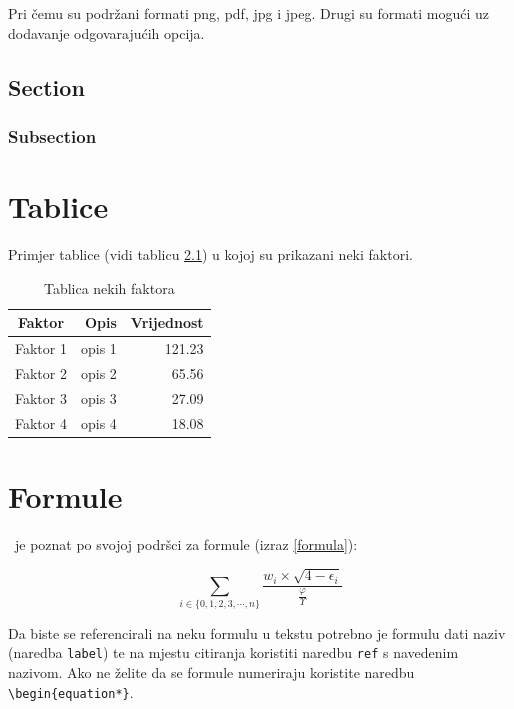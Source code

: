 \documentclass[a4paper,12pt]{foi}
\begin{document}
Pri \v{c}emu su podr\v{z}ani formati png, pdf, jpg i jpeg. Drugi su formati mogu\'{c}i uz dodavanje odgovaraju\'{c}ih opcija.

\section{Section}
\subsection{Subsection}


\chapter{Tablice}

Primjer tablice (vidi tablicu \ref{tablica-1}) u kojoj su prikazani neki faktori.


\begin{table}[h]
\caption{Tablica nekih faktora}
\begin{center}
\begin{tabular}{||c|r|r||}
\hline
\textbf{Faktor}&\textbf{Opis}&\textbf{Vrijednost} \\
\hline
Faktor 1&opis 1&121.23 \\
Faktor 2&opis 2&65.56 \\
Faktor 3&opis 3&27.09 \\
Faktor 4&opis 4&18.08 \\
\hline
\end{tabular}
\end{center}
\label{tablica-1}
\end{table}

\chapter{Formule}

\LaTeXe\ je poznat po svojoj podr\v{s}ci za formule (izraz \ref{formula}):

\begin{equation}
 \label{formula}
 \displaystyle\sum_{i \in \{ 0, 1, 2, 3, \cdots, n\}}{\frac{w_i \times \sqrt{4 - \epsilon_i}}{\frac{\varphi}{\Upsilon}}}
\end{equation} 

Da biste se referencirali na neku formulu u tekstu potrebno je formulu dati naziv (naredba \texttt{label}) te na mjestu citiranja koristiti naredbu \texttt{ref} s navedenim nazivom. Ako ne želite da se formule numeriraju koristite naredbu \texttt{\textbackslash begin\{equation*\}}.
\end{document}
